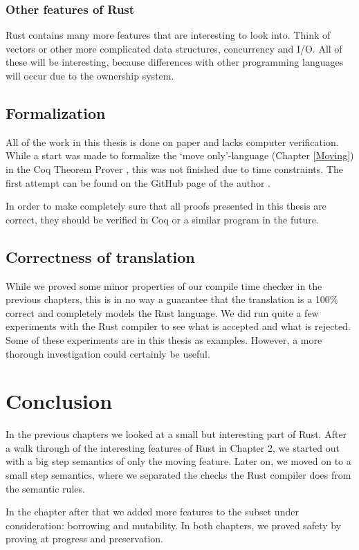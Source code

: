\subsubsection*{Other features of Rust}
Rust contains many more features that are interesting to look into. Think of vectors or other more complicated data structures, concurrency and I/O. All of these will be interesting, because differences with other programming languages will occur due to the ownership system.  

\subsection{Formalization}
All of the work in this thesis is done on paper and lacks computer verification. While a start was made to formalize the `move only'-language (Chapter \ref{Moving}) in the Coq Theorem Prover \citep{barras1997coq}, this was not finished due to time constraints. The first attempt can be found on the GitHub page of the author \citep{github}. 

In order to make completely sure that all proofs presented in this thesis are correct, they should be verified in Coq or a similar program in the future. 

\subsection{Correctness of translation}
While we proved some minor properties of our compile time checker in the previous chapters, this is in no way a guarantee that the translation is a 100\% correct and completely models the Rust language. We did run quite a few experiments with the Rust compiler to see what is accepted and what is rejected. Some of these experiments are in this thesis as examples. 
However, a more thorough investigation could certainly be useful. 

\section{Conclusion}
In the previous chapters we looked at a small but interesting part of Rust. After a walk through of the interesting features of Rust in Chapter 2, we started out with a big step semantics of only the moving feature. Later on, we moved on to a small step semantics, where we separated the checks the Rust compiler does from the semantic rules. 

In the chapter after that we added more features to the subset under consideration: borrowing and mutability. In both chapters, we proved safety by proving at progress and preservation. 
